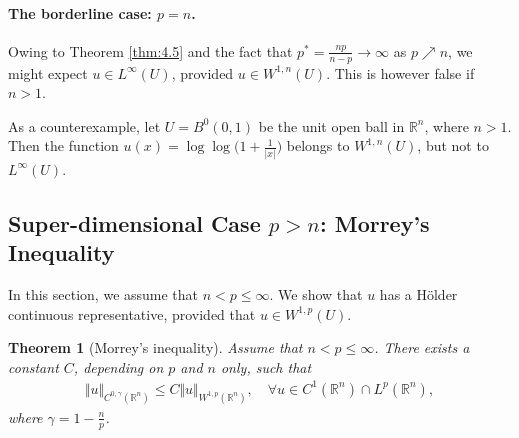 \documentclass{article}
\numberwithin{equation}{section}
\newcommand{\bbR}{\mathbb{R}}
\theoremstyle{plain}
\newtheorem{theorem}{Theorem}[section]
\theoremstyle{definition}
\begin{document}
\paragraph{The borderline case: $p=n$.} Owing to Theorem \ref{thm:4.5} and the fact that $p^*=\frac{np}{n-p}\to\infty$ as $p\nearrow n$, we might expect $u\in L^\infty(U)$, provided $u\in W^{1,n}(U)$. This is however false if $n>1$. 

As a counterexample, let $U=B^0(0,1)$ be the unit open ball in $\bbR^n$, where $n>1$. Then the function $u(x)=\log\log\bigl(1+\frac{1}{\vert x\vert}\bigr)$ belongs to $W^{1,n}(U)$, but not to $L^\infty(U)$.

\subsection{Super-dimensional Case $p>n$: Morrey's Inequality}
In this section, we assume that $n<p\leq\infty$. We show that $u$ has a Hölder continuous representative, provided that $u\in W^{1,p}(U)$.
\begin{theorem}[Morrey's inequality]\label{morreyinequality}
Assume that $n<p\leq\infty$. There exists a constant $C$, depending on $p$ and $n$ only, such that
\begin{align}
	\Vert u\Vert_{C^{0,\gamma}(\bbR^n)}\leq C\Vert u\Vert_{W^{1,p}(\bbR^n)},\quad\forall u\in C^1(\bbR^n)\cap L^p(\bbR^n),\label{morrey}
\end{align}
where $\gamma=1-\frac{n}{p}$.
\end{theorem}
\end{document}
